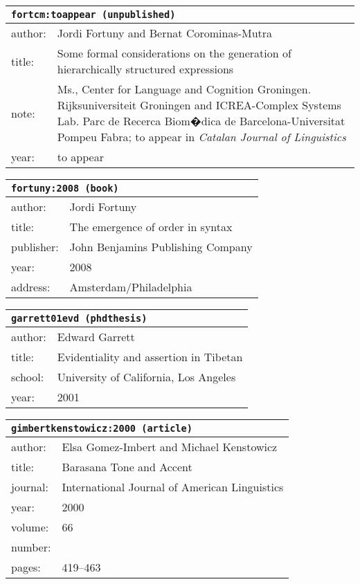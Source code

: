 \documentclass{article}
\begin{document}
\bigskip

\begin{tabular}{p{}p{}}
\multicolumn{2}{l}{\texttt{fortcm:toappear (unpublished)}}\\
\hline
author: & Jordi Fortuny and Bernat Corominas-Mutra\\
title: & Some formal considerations on the generation of hierarchically structured expressions\\
note: & \textsc{M}s., Center for Language and Cognition Groningen. Rijksuniversiteit Groningen and ICREA-Complex Systems Lab. Parc de Recerca Biom�dica de Barcelona-Universitat Pompeu Fabra; to appear in \textsl{Catalan Journal of Linguistics}\\
year: & to appear\\
\end{tabular}

\bigskip

\begin{tabular}{p{}p{}}
\multicolumn{2}{l}{\texttt{fortuny:2008 (book)}}\\
\hline
author: & Jordi Fortuny\\
title: & The emergence of order in syntax\\
publisher: & John Benjamins Publishing Company\\
year: & 2008\\
address: & Amsterdam/Philadelphia\\
\end{tabular}

\bigskip

\begin{tabular}{p{}p{}}
\multicolumn{2}{l}{\texttt{garrett01evd (phdthesis)}}\\
\hline
author: & Edward Garrett\\
title: & Evidentiality and assertion in Tibetan\\
school: & University of California, Los Angeles\\
year: & 2001\\
\end{tabular}

\bigskip

\begin{tabular}{p{}p{}}
\multicolumn{2}{l}{\texttt{gimbertkenstowicz:2000 (article)}}\\
\hline
author: & Elsa Gomez-Imbert and Michael Kenstowicz\\
title: & Barasana Tone and Accent\\
journal: & International Journal of American Linguistics\\
year: & 2000\\
volume: & 66\\
number: & \\
pages: & 419--463\\
\end{tabular}
\end{document}
